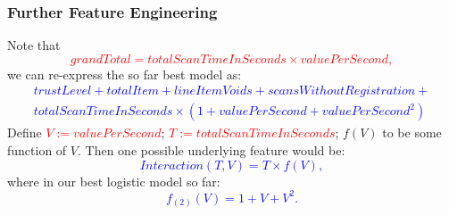 \documentclass{beamer}
\begin{document}
\begin{frame}
\frametitle{Further Feature Engineering}
Note that  \textcolor{red}{
$$grandTotal = totalScanTimeInSeconds \times valuePerSecond,$$}
 we can re-express the so far best model as:
\textcolor{blue}{
\begin{align*}
trustLevel + totalItem + lineItemVoids + scansWithoutRegistration +\\
 totalScanTimeInSeconds \times (1 + valuePerSecond + valuePerSecond^2)
\end{align*}
}
 Define \textcolor{red}{$V:= valuePerSecond$}; \textcolor{red}{$T:=totalScanTimeInSeconds$}; $f(V)$ to be some function of $V$. Then one possible underlying feature would be: 
 \textcolor{blue}{$$ Interaction(T,V) = T \times f(V) , $$}
where in our best logistic model so far: \textcolor{blue}{
$$  f_{(2)}(V) = 1 + V + V^2. $$}

\end{frame}
\end{document}
